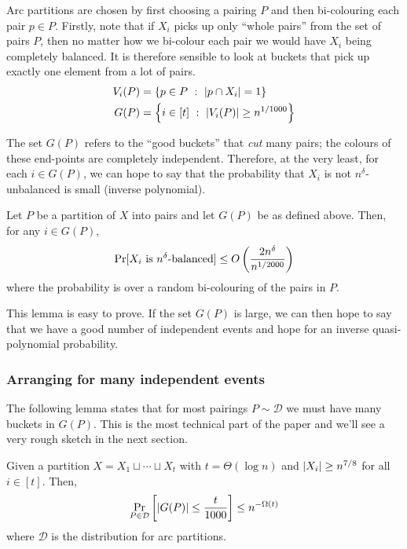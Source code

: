 Arc partitions are chosen by first choosing a pairing $P$ and then bi-colouring each pair $p \in P$.
Firstly, note that if $X_i$ picks up only ``whole pairs'' from the set of pairs $P$, then no matter how we bi-colour each pair we would have $X_i$ being completely balanced.
It is therefore sensible to look at buckets that pick up exactly one element from a lot of pairs.
\begin{align*}
	 V_i(P) &= \left\{{ p \in P}\ : \ {\left| p \cap X_i \right| = 1 }\right\}\\
	G(P) &= \left\{{ i \in [t]}\ : \ {\left| V_i(P) \right| \geq n^{1/1000} }\right\}
\end{align*}

The set $G(P)$ refers to the ``good buckets'' that \emph{cut} many pairs; the colours of these end-points are completely independent.
Therefore, at the very least, for each $i \in G(P)$, we can hope to say that the probability that $X_i$ is not $n^{\delta}$-unbalanced is small (inverse polynomial).

\begin{lemma}
  \label{lem:MLSep:bound-for-good-buckets}
  Let $P$ be a partition of $X$ into pairs and let $G(P)$ be as defined above. 
  Then, for any $i \in G(P)$,
  \[
    \Pr[ \text{$X_i$ is $n^{\delta}$-balanced} ] \leq O\left(\frac{2n^{\delta}}{n^{1/2000}}\right)
  \]
  where the probability is over a random bi-colouring of the pairs in $P$. 
\end{lemma}

This lemma is easy to prove.
If the set $G(P)$ is large, we can then hope to say that we have a good number of independent events and hope for an inverse quasi-polynomial probability.

\subsubsection*{Arranging for many independent events}

The following lemma states that for most pairings $P \sim \mathcal{D}$ we must have many buckets in $G(P)$.
This is the most technical part of the paper and we'll see a very rough sketch in the next section.

\begin{lemma}
\label{lem:manyBucketsWithCuts}
Given a partition $X = X_1 \sqcup \cdots \sqcup X_t$ with $t = \Theta(\log n)$ and $\left|X_i\right| \geq n^{7/8}$ for all $i \in [t]$. Then,
\[
 \Pr_{P \in \mathcal{D}} \left[ \left|G(P)\right| \leq \frac{t}{1000} \right] \leq n^{- \Omega(t)}
\]
where $\mathcal{D}$ is the distribution for arc partitions.
\end{lemma}

